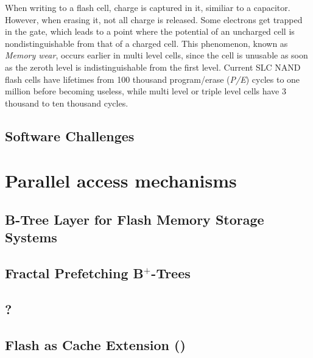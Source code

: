 \documentclass{acm_proc_article-sp}
\begin{document}
When writing to a flash cell, charge is captured in it, similiar to a capacitor. %
However, when erasing it, not all charge is released. Some electrons get trapped in the gate, which leads to a point where the potential of an uncharged cell is nondistinguishable from that of a charged cell. This phenomenon, known as \emph{Memory wear}, occurs earlier in multi level cells, since the cell is unusable as soon as the zeroth level is indistinguishable from the first level.
Current SLC NAND flash cells have lifetimes from 100 thousand program/erase (\emph{P/E}) cycles to one million before becoming useless, while multi level or triple level cells have 3 thousand to ten thousand cycles.


\subsection{Software Challenges}




\section{Parallel access mechanisms}

\subsection{B-Tree Layer for Flash Memory Storage Systems}

\cite{wu2007efficient}

\subsection{Fractal Prefetching B$^{+}$-Trees}

\cite{chen2002fractal}

\subsection{?} %

\subsection{Flash as Cache Extension ()}
\end{document}
